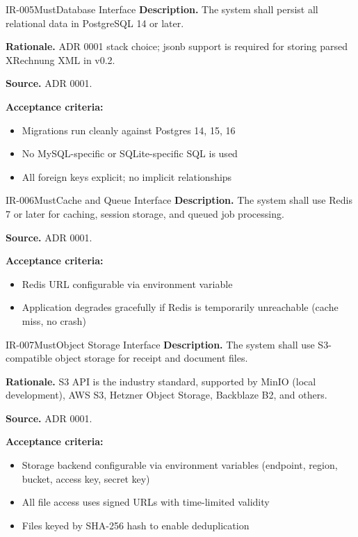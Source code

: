 \documentclass[11pt,a4paper]{article}
\begin{document}
\begin{requirement}{IR-005}{Must}{Database Interface}
\textbf{Description.} The system shall persist all relational data in PostgreSQL 14 or later.

\textbf{Rationale.} ADR 0001 stack choice; jsonb support is required for storing parsed XRechnung XML in v0.2.

\textbf{Source.} ADR 0001.

\textbf{Acceptance criteria:}
\begin{itemize}
    \item Migrations run cleanly against Postgres 14, 15, 16
    \item No MySQL-specific or SQLite-specific SQL is used
    \item All foreign keys explicit; no implicit relationships
\end{itemize}
\end{requirement}

\begin{requirement}{IR-006}{Must}{Cache and Queue Interface}
\textbf{Description.} The system shall use Redis 7 or later for caching, session storage, and queued job processing.

\textbf{Source.} ADR 0001.

\textbf{Acceptance criteria:}
\begin{itemize}
    \item Redis URL configurable via environment variable
    \item Application degrades gracefully if Redis is temporarily unreachable (cache miss, no crash)
\end{itemize}
\end{requirement}

\begin{requirement}{IR-007}{Must}{Object Storage Interface}
\textbf{Description.} The system shall use S3-compatible object storage for receipt and document files.

\textbf{Rationale.} S3 API is the industry standard, supported by MinIO (local development), AWS S3, Hetzner Object Storage, Backblaze B2, and others.

\textbf{Source.} ADR 0001.

\textbf{Acceptance criteria:}
\begin{itemize}
    \item Storage backend configurable via environment variables (endpoint, region, bucket, access key, secret key)
    \item All file access uses signed URLs with time-limited validity
    \item Files keyed by SHA-256 hash to enable deduplication
\end{itemize}
\end{requirement}
\end{document}
